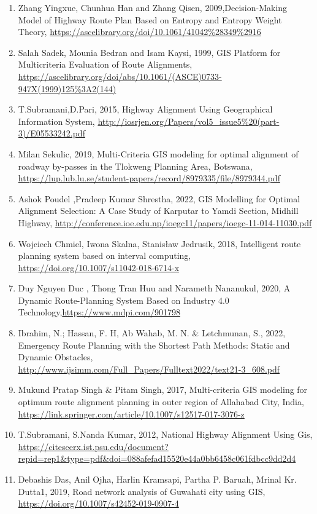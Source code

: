 \begin{enumerate}
\item Zhang Yingxue, Chunhua Han and Zhang Qisen, 2009,Decision-Making Model of Highway Route Plan Based on Entropy and Entropy Weight Theory, \url{https://ascelibrary.org/doi/10.1061/41042%28349%2916}
\item Salah Sadek, Mounia Bedran and Isam Kaysi, 1999, GIS Platform for Multicriteria Evaluation of Route Alignments, \url{https://ascelibrary.org/doi/abs/10.1061/(ASCE)0733-947X(1999)125%3A2(144)}
\item T.Subramani,D.Pari, 2015, Highway Alignment Using Geographical Information System, \url{http://iosrjen.org/Papers/vol5_issue5%20(part-3)/E05533242.pdf}
\item Milan Sekulic, 2019, Multi-Criteria GIS modeling for optimal alignment of roadway 
by-passes in the Tlokweng Planning Area, Botswana, \url{https://lup.lub.lu.se/student-papers/record/8979335/file/8979344.pdf}
\item Ashok Poudel ,Pradeep Kumar Shrestha, 2022, GIS Modelling for Optimal Alignment Selection: A Case Study of Karputar to Yamdi Section, Midhill Highway, \url{http://conference.ioe.edu.np/ioegc11/papers/ioegc-11-014-11030.pdf}
\item Wojciech Chmiel, Iwona Skalna, Stanisław Jedrusik, 2018, Intelligent route planning system based on interval computing, \url{https://doi.org/10.1007/s11042-018-6714-x}
\item Duy Nguyen Duc , Thong Tran Huu and Narameth Nananukul, 2020, A Dynamic Route-Planning System Based on Industry 4.0 Technology,\url{https://www.mdpi.com/901798}
\item Ibrahim, N.; Hassan, F. H, Ab Wahab, M. N. & Letchmunan, S., 2022, Emergency Route Planning with the Shortest Path Methods: Static and
Dynamic Obstacles, \url{http://www.ijsimm.com/Full_Papers/Fulltext2022/text21-3_608.pdf}
\item Mukund Pratap Singh & Pitam Singh, 2017, Multi-criteria GIS modeling for optimum route alignment planning in outer region of Allahabad City, India, \url{https://link.springer.com/article/10.1007/s12517-017-3076-z}
\item T.Subramani, S.Nanda Kumar, 2012, National Highway Alignment Using Gis, \url{https://citeseerx.ist.psu.edu/document?repid=rep1&type=pdf&doi=088afefad15520e44a0bb6458c061fdbcc9dd2d4}
\item Debashis Das, Anil Ojha, Harlin Kramsapi, Partha P. Baruah, Mrinal Kr. Dutta1, 2019, Road network analysis of Guwahati city using GIS, \url{https://doi.org/10.1007/s42452-019-0907-4}

\end{enumerate}
